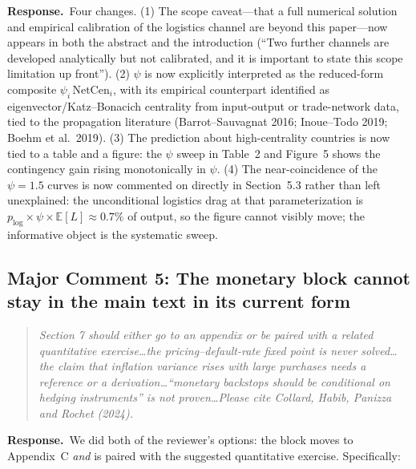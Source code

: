 \documentclass[11pt]{article}
\newcounter{comment}
\newenvironment{revcomment}%
{\refstepcounter{comment}\par\medskip\noindent\begin{quote}\itshape\color{black!70}}%
{\end{quote}\medskip}
\newcommand{\response}{\par\noindent\textbf{Response.}\ }
\begin{document}
\response Four changes. (1) The scope caveat---that a full numerical solution and empirical calibration of the logistics channel are beyond this paper---now appears in both the abstract and the introduction (``Two further channels are developed analytically but not calibrated, and it is important to state this scope limitation up front''). (2) $\psi$ is now explicitly interpreted as the reduced-form composite $\psi_i\,\mathrm{NetCen}_i$, with its empirical counterpart identified as eigenvector/Katz--Bonacich centrality from input-output or trade-network data, tied to the propagation literature (Barrot--Sauvagnat 2016; Inoue--Todo 2019; Boehm et al.\ 2019). (3) The prediction about high-centrality countries is now tied to a table and a figure: the $\psi$ sweep in Table~2 and Figure~5 shows the contingency gain rising monotonically in $\psi$. (4) The near-coincidence of the $\psi=1.5$ curves is now commented on directly in Section~5.3 rather than left unexplained: the unconditional logistics drag at that parameterization is $p_{\log}\times\psi\times\mathbb{E}[L]\approx 0.7\%$ of output, so the figure cannot visibly move; the informative object is the systematic sweep.

\subsection*{Major Comment 5: The monetary block cannot stay in the main text in its current form}

\begin{revcomment}
Section 7 should either go to an appendix or be paired with a related quantitative exercise\ldots the pricing--default-rate fixed point is never solved\ldots the claim that inflation variance rises with large purchases needs a reference or a derivation\ldots ``monetary backstops should be conditional on hedging instruments'' is not proven\ldots Please cite Collard, Habib, Panizza and Rochet (2024).
\end{revcomment}

\response We did both of the reviewer's options: the block moves to Appendix~C \emph{and} is paired with the suggested quantitative exercise. Specifically:
\end{document}
